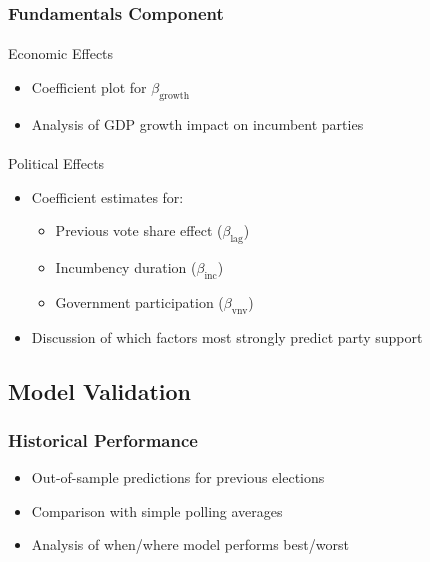 \documentclass[
  letterpaper,
  DIV=11,
  numbers=noendperiod]{scrartcl}
\makeatletter
\let\oldparagraph\paragraph
\renewcommand{\paragraph}{
    \@ifstar
      \xxxParagraphStar
      \xxxParagraphNoStar
  }
\newcommand{\xxxParagraphStar}[1]{\oldparagraph*{#1}\mbox{}}
\newcommand{\xxxParagraphNoStar}[1]{\oldparagraph{#1}\mbox{}}
\providecommand{\tightlist}{%
  \setlength{\itemsep}{0pt}\setlength{\parskip}{0pt}}\usepackage{longtable,booktabs,array}
\makeatother
\begin{document}
\subsubsection{Fundamentals Component}\label{fundamentals-component-1}

\paragraph{Economic Effects}\label{economic-effects}

\begin{itemize}
\tightlist
\item
  Coefficient plot for \(\beta_\text{growth}\)
\item
  Analysis of GDP growth impact on incumbent parties
\end{itemize}

\paragraph{Political Effects}\label{political-effects}

\begin{itemize}
\tightlist
\item
  Coefficient estimates for:

  \begin{itemize}
  \tightlist
  \item
    Previous vote share effect (\(\beta_\text{lag}\))
  \item
    Incumbency duration (\(\beta_\text{inc}\))
  \item
    Government participation (\(\beta_\text{vnv}\))
  \end{itemize}
\item
  Discussion of which factors most strongly predict party support
\end{itemize}

\subsection{Model Validation}\label{model-validation}

\subsubsection{Historical Performance}\label{historical-performance}

\begin{itemize}
\tightlist
\item
  Out-of-sample predictions for previous elections
\item
  Comparison with simple polling averages
\item
  Analysis of when/where model performs best/worst
\end{itemize}
\end{document}
